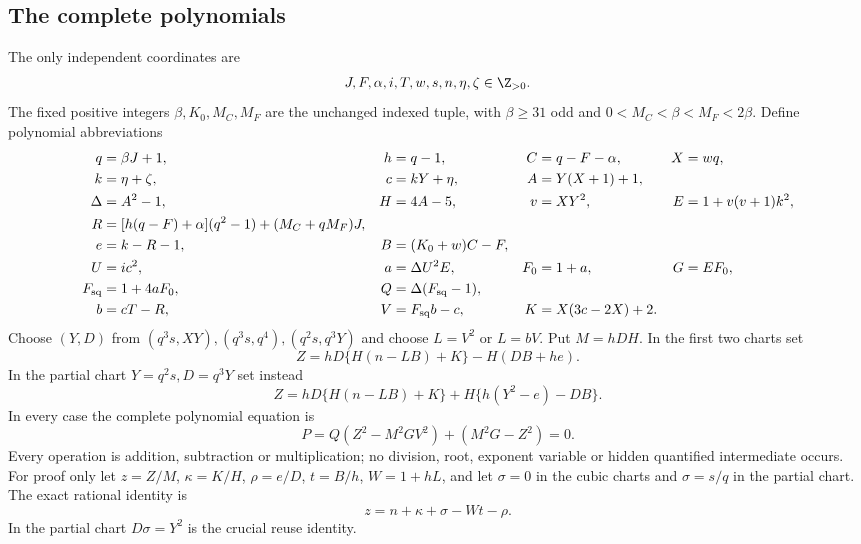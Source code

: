 \subsection{The complete polynomials}
The only independent coordinates are
\[
 J,F,\alpha,i,T,w,s,n,\eta,\zeta\in\Z_{>0}.
\]
The fixed positive integers $\beta,K_0,M_C,M_F$ are the unchanged indexed
tuple, with $\beta\ge31$ odd and $0<M_C<\beta<M_F<2\beta$.
Define polynomial abbreviations
\begin{align*}
 q&=\beta J+1,&h&=q-1,&C&=q-F-\alpha,&X&=wq,\\
 k&=\eta+\zeta,&c&=kY+\eta,&A&=Y(X+1)+1,\\
 \Delta&=A^2-1,&H&=4A-5,&v&=XY^2,&E&=1+v(v+1)k^2,\\
 R&=[h(q-F)+\alpha](q^2-1)+(M_C+qM_F)J,\\
 e&=k-R-1,&B&=(K_0+w)C-F,\\
 U&=ic^2,&a&=\Delta U^2E,&F_0&=1+a,&G&=EF_0,\\
 F_{\rm sq}&=1+4aF_0,&Q&=\Delta(F_{\rm sq}-1),\\
 b&=cT-R,&V&=F_{\rm sq}b-c,&K&=X(3c-2X)+2.
\end{align*}
Choose $(Y,D)$ from $(q^3s,XY),(q^3s,q^4),(q^2s,q^3Y)$ and choose
$L=V^2$ or $L=bV$. Put $M=hDH$. In the first two charts set
\[
 Z=hD\{H(n-LB)+K\}-H(DB+he).
\]
In the partial chart $Y=q^2s,D=q^3Y$ set instead
\[
 Z=hD\{H(n-LB)+K\}+H\{h(Y^2-e)-DB\}.
\]
In every case the complete polynomial equation is
\begin{equation}\label{eq:newcompact}
 P=Q(Z^2-M^2GV^2)+(M^2G-Z^2)=0.
\end{equation}
Every operation is addition, subtraction or multiplication; no division,
root, exponent variable or hidden quantified intermediate occurs.
For proof only let $z=Z/M$, $\kappa=K/H$, $\rho=e/D$,
$t=B/h$, $W=1+hL$, and let $\sigma=0$ in the cubic charts and
$\sigma=s/q$ in the partial chart. The exact rational identity is
\begin{equation}\label{eq:compactcarrier}
 z=n+\kappa+\sigma-Wt-\rho.
\end{equation}
In the partial chart $D\sigma=Y^2$ is the crucial reuse identity.

